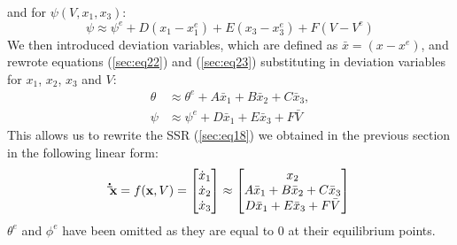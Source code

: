 \documentclass[a4paper,10pt,reqno]{amsart}
\numberwithin{equation}{section}
\begin{document}
and for $\psi(V, x_1, x_3)$:
\begin{equation}
\label{sec:eq23}
    \psi \approx \psi^{e} + D(x_1-x_1^e) + E(x_3-x_3^e) + F(V-V^e)
\end{equation}
We then introduced deviation variables, which are defined as $\bar x=(x-x^e)$, and rewrote equations (\ref{sec:eq22}) and (\ref{sec:eq23}) substituting in deviation variables for $x_1$, $x_2$, $x_3$ and $V$:
\begin{align}
\label{sec:eq24}
    \theta &\approx \theta^e + A\bar x_1 + B\bar x_2 + C\bar x_3, \\
    \psi &\approx \psi^e + D\bar x_1 + E\bar x_3 + F\bar V
\end{align}
This allows us to rewrite the SSR (\ref{sec:eq18}) we obtained in the previous section in the following linear form:
\begin{equation}
\label{sec:eq26}
    \bold{\dot \bar{x}} = f(\bold x, V) = \begin{bmatrix} 
        \dot x_1 \\ 
        \dot x_2 \\ 
        \dot x_3 
    \end{bmatrix} \approx \begin{bmatrix}
        x_2 \\
        A\bar x_1 + B\bar x_2 + C\bar x_3 \\
        D\bar x_1 + E\bar x_3 + F\bar V
    \end{bmatrix}
\end{equation}
$\theta^e$ and $\phi^e$ have been omitted as they are equal to 0 at their equilibrium points.
\end{document}
